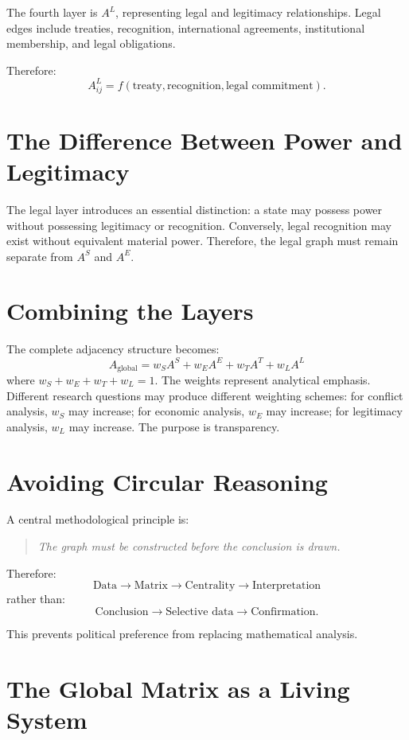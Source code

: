 \documentclass[11pt,openany]{book}
\theoremstyle{plain}
\theoremstyle{definition}
\begin{document}
The fourth layer is \(A^L\), representing legal and legitimacy relationships. Legal edges include treaties, recognition, international agreements, institutional membership, and legal obligations.

Therefore:
\[
A^L_{ij} = f(\text{treaty}, \text{recognition}, \text{legal commitment}).
\]

\section*{The Difference Between Power and Legitimacy}

The legal layer introduces an essential distinction: a state may possess power without possessing legitimacy or recognition. Conversely, legal recognition may exist without equivalent material power. Therefore, the legal graph must remain separate from \(A^S\) and \(A^E\).

\section*{Combining the Layers}

The complete adjacency structure becomes:
\[
A_{\text{global}} = w_S A^S + w_E A^E + w_T A^T + w_L A^L
\]
where \(w_S + w_E + w_T + w_L = 1\). The weights represent analytical emphasis. Different research questions may produce different weighting schemes: for conflict analysis, \(w_S\) may increase; for economic analysis, \(w_E\) may increase; for legitimacy analysis, \(w_L\) may increase. The purpose is transparency.

\section*{Avoiding Circular Reasoning}

A central methodological principle is:
\begin{quote}
\textit{The graph must be constructed before the conclusion is drawn.}
\end{quote}

Therefore:
\[
\text{Data}
\longrightarrow
\text{Matrix}
\longrightarrow
\text{Centrality}
\longrightarrow
\text{Interpretation}
\]
rather than:
\[
\text{Conclusion}
\longrightarrow
\text{Selective data}
\longrightarrow
\text{Confirmation}.
\]

This prevents political preference from replacing mathematical analysis.

\section*{The Global Matrix as a Living System}
\end{document}
